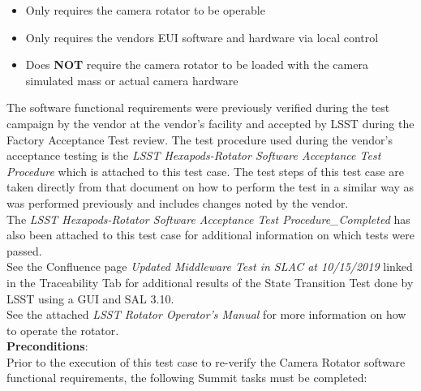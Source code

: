\documentclass[SE,lsstdraft,STR,toc]{lsstdoc}
\providecommand{\tightlist}{
  \setlength{\itemsep}{0pt}\setlength{\parskip}{0pt}}
\begin{document}
\begin{itemize}
\tightlist
\item
  Only requires the camera rotator to be operable
\item
  Only requires the vendors EUI software and hardware via local control
\item
  Does \textbf{NOT} require the camera rotator to be loaded with the
  camera simulated mass or actual camera hardware
\end{itemize}

The software functional requirements were previously verified during the
test campaign by the vendor at the vendor's facility and accepted by
LSST during the Factory Acceptance Test review. The test procedure used
during the vendor's acceptance testing is the \emph{LSST
Hexapods-Rotator Software Acceptance Test Procedure} which is attached
to this test case. The test steps of this test case are taken directly
from that document on how to perform the test in a similar way as was
performed previously and includes changes noted by the
vendor.\\[2\baselineskip]The \emph{LSST Hexapods-Rotator Software
Acceptance Test Procedure\_Completed} has also been attached to this
test case for additional information on which tests were
passed.\\[2\baselineskip]See the Confluence page \emph{Updated
Middleware Test in SLAC at 10/15/2019} linked in the Traceability Tab
for additional results of the State Transition Test done by LSST using a
GUI and SAL 3.10.\\[2\baselineskip]See the attached \emph{LSST Rotator
Operator's Manual} for more information on how to operate the
rotator.\\[2\baselineskip]


\textbf{ Preconditions}:\\
Prior to the execution of this test case to re-verify the Camera Rotator
software functional requirements, the following Summit tasks must be
completed:\\
\end{document}
